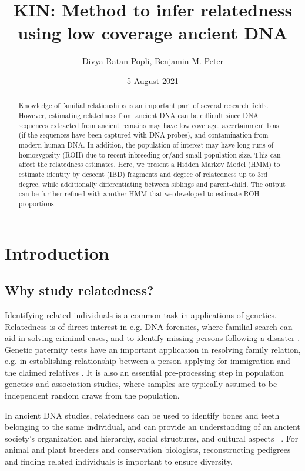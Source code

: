 \documentclass[12pt, letterpaper]{article}
\title{KIN: Method to infer relatedness using low coverage ancient DNA}
\author{Divya Ratan Popli, Benjamin M. Peter}
\date{5 August 2021}
\begin{document}
\nolinenumbers

\maketitle

\begin{abstract}

\noindent Knowledge of familial relationships is an important part of several research fields. However, estimating relatedness from ancient DNA can be difficult since DNA sequences extracted from ancient remains may have low coverage, ascertainment bias (if the sequences have been captured with DNA probes), and contamination from modern human DNA. In addition, the population of interest may have long runs of homozygosity (ROH) due to recent inbreeding or/and small population size. This can affect the relatedness estimates. Here, we present a Hidden Markov Model (HMM) to estimate identity by descent (IBD) fragments and degree of relatedness up to 3rd degree, while additionally differentiating between siblings and parent-child. The output can be further refined with another HMM that we developed to estimate ROH proportions.
\end{abstract}

\section{Introduction}

\subsection{Why study relatedness?}

Identifying related individuals is a common task in applications of genetics. Relatedness is of direct interest in e.g. DNA forensics, where familial search can aid in solving criminal cases, and to identify missing persons following a disaster \cite{murphy_law_2018,ram_genealogy_2018}. Genetic paternity tests have an important application in resolving family relation, e.g. in establishing relationship between a person applying for immigration and the claimed relatives \cite{egeland_beyond_2000}. It is also an essential pre-processing step in population genetics and association studies, where samples are typically assumed to be independent random draws from the population.

In ancient DNA studies, relatedness can be used to identify bones and teeth belonging to the same individual, and can provide an understanding of an ancient society's organization and hierarchy, social structures, and cultural aspects ~\cite{baca_ancient_2012,mittnik_KINship-based_2019,sikora_ancient_2017}. For animal and plant breeders and conservation biologists, reconstructing pedigrees and finding related individuals is important to ensure diversity. ~\cite{habier_impact_2007,oliehoek_estimating_2006,kardos_measuring_2015} 
\end{document}
